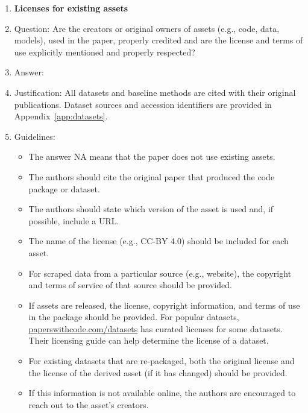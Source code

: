 \documentclass{article}
\theoremstyle{plain}
\theoremstyle{definition}
\begin{document}
\begin{enumerate}
  \item {\bf Licenses for existing assets}
  \item[] Question: Are the creators or original owners of assets (e.g., code, data, models), used in the paper, properly credited and are the license and terms of use explicitly mentioned and properly respected?
  \item[] Answer: \answerYes{}
  \item[] Justification: All datasets and baseline methods are cited with their original publications. Dataset sources and accession identifiers are provided in Appendix~\ref{app:datasets}.
  \item[] Guidelines:
    \begin{itemize}
      \item The answer NA means that the paper does not use existing assets.
      \item The authors should cite the original paper that produced the code package or dataset.
      \item The authors should state which version of the asset is used and, if possible, include a URL.
      \item The name of the license (e.g., CC-BY 4.0) should be included for each asset.
      \item For scraped data from a particular source (e.g., website), the copyright and terms of service of that source should be provided.
      \item If assets are released, the license, copyright information, and terms of use in the package should be provided. For popular datasets, \url{paperswithcode.com/datasets} has curated licenses for some datasets. Their licensing guide can help determine the license of a dataset.
      \item For existing datasets that are re-packaged, both the original license and the license of the derived asset (if it has changed) should be provided.
      \item If this information is not available online, the authors are encouraged to reach out to the asset's creators.
    \end{itemize}


\end{enumerate}
\end{document}
